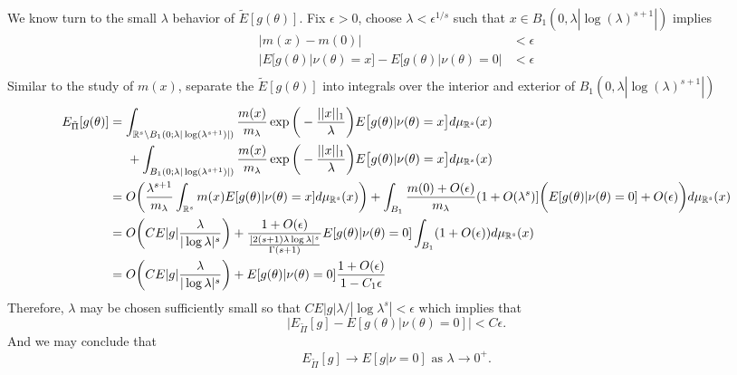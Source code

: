 \documentclass[10pt,fleqn]{article}
\DeclareMathOperator{\1}{\mathbbm{1}}
\begin{document}
{We know turn to the small $\lambda$ behavior of $\tilde{E}[g(\theta)].$  Fix $\epsilon >0$, choose $\lambda<\epsilon^{1/s}$ such that $x\in B_1(0,\lambda|\log(\lambda)^{s+1}|)$ implies
\begin{align*}
|m(x)- m(0)| &< \epsilon \\
|E[g(\theta)|\nu(\theta)=x] - E[g(\theta)|\nu(\theta)=0 | & < \epsilon \\
\end{align*}
Similar to the study of $m(x)$, separate the $\tilde{E}[g(\theta)]$ into integrals over the interior and exterior of $B_1(0,\lambda|\log(\lambda)^{s+1}|)$
\begin{align*}
E_{\tilde{\Pi}}[g(\theta)] &= \int_{\mathbb{R}^s \setminus B_1(0;\lambda|\log(\lambda^{s+1})|)} \frac{m(x)}{m_\lambda}\exp\bigg(-\frac{||x||_1}{\lambda}\bigg) E\big[g(\theta)|\nu(\theta)=x\big] d\mu_{\mathbb{R}^s}(x) \\
&\hspace{0.5 cm} + \int_{B_1(0;\lambda|\log(\lambda^{s+1})|)} \frac{m(x)}{m_\lambda}\exp\bigg(-\frac{||x||_1}{\lambda}\bigg) E\big[g(\theta)|\nu(\theta)=x\big] d\mu_{\mathbb{R}^s}(x) \\
&= O\bigg( \frac{\lambda^{s+1}}{m_\lambda} \int_{\mathbb{R}^s} m(x) E[g(\theta)|\nu(\theta)=x]d\mu_{\mathbb{R}^s}(x)\bigg) + \int_{B_1} \frac{m(0)+O(\epsilon)}{m_\lambda}(1+O(\lambda^s)]\bigg(E[g(\theta)|\nu(\theta)=0] + O(\epsilon)\bigg) d\mu_{\mathbb{R}^s} (x) \\
&= O\bigg( C E|g|\frac{\lambda}{|\log\lambda|^s}\bigg) + \frac{1+O(\epsilon)}{ \frac{|2(s+1)\lambda \log \lambda |^s}{\Gamma(s+1)} } E[g(\theta)|\nu(\theta) = 0] \int_{B_1}(1+O(\epsilon))d\mu_{\mathbb{R}^s}(x) \\
&=O\bigg(C E|g|\frac{\lambda}{|\log\lambda|^s}\bigg)  +E[g(\theta)|\nu(\theta)=0] \frac{1+O(\epsilon)}{1-C_1\epsilon}
\end{align*}
Therefore, $\lambda$ may be chosen sufficiently small so that $CE|g|\lambda/|\log\lambda^s| < \epsilon $ which implies that 
$$\bigg|E_{\tilde{\Pi}}[g] - E[g(\theta)|\nu(\theta) = 0] \bigg| < C\epsilon.$$
And we may conclude that $$E_{\tilde{\Pi}}[g] \to E[g|\nu = 0] \text{ as } \lambda\to0^+.$$

}



\end{document}
